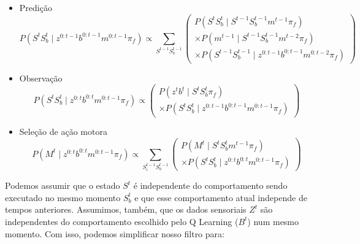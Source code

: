 \begin{itemize}
	\item Predição
		\begin{equation}
    P \left( S^t S_b^t \mid z^{0: t-1} b^{0: t-1} m^{0: t-1} \pi_f \right) \propto \sum\limits_{S^{t-1} S_b^{t-1}}
        \left(
            \begin{array}{l}
                P \left( S^t S_b^t \mid S^{t-1} S_b^{t-1}  m^{t-1} \pi_f \right) \\
                \times P \left( m^{t-1} \mid S^{t-1} S_b^{t-1} m^{t-2} \pi_f \right)\\
                \times P \left( S^{t-1} S_b^{t-1} \mid z^{0: t-1} b^{0: t-1} m^{0: t-2} \pi_f \right)
            \end{array}
        \right)
		\end{equation}
	\item Observação
		\begin{equation}
    P \left( S^t S_b^t \mid z^{0: t} b^{0: t} m^{0: t-1} \pi_f \right) \propto
        \left(
            \begin{array}{l}
                P \left( z^t b^t \mid S^t S_b^t \pi_f \right) \\
                \times P \left( S^t S_b^t \mid z^{0: t-1} b^{0: t-1} m^{0: t-1} \pi_f \right)
            \end{array}
        \right)
		\end{equation}
	\item Seleção de ação motora
		\begin{equation}
    P \left( M^t \mid z^{0: t} b^{0: t} m^{0: t-1} \pi_f \right) \propto \sum\limits_{S_i^{t-1} S_b^{t-1}}
        \left(
            \begin{array}{l}
                P \left( M^t \mid S^t S_b^t m^{t-1} \pi_f \right)\\
                \times P \left( S^t S_b^t \mid z^{0: t} b^{0: t} m^{0: t-1} \pi_f \right)
            \end{array}
        \right)
		\end{equation}
\end{itemize}

Podemos assumir que o estado $ S^t $ é independente do comportamento sendo executado no mesmo momento $ S_b^t $ e que esse comportamento atual independe de tempos anteriores. Assumimos, também, que os dados sensoriais $ Z^t $ são independentes do comportamento escolhido pelo Q Learning ($ B^t $) num mesmo momento. Com isso, podemos simplificar nosso filtro para:


